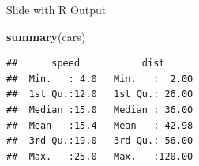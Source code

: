 \documentclass[
  ignorenonframetext,
  aspectratio=169,
  xcolor=dvipsnames]{beamer}
\newenvironment{Shaded}{\begin{snugshade}}{\end{snugshade}}
\newcommand{\FunctionTok}[1]{\textcolor[rgb]{0.13,0.29,0.53}{\textbf{#1}}}
\newcommand{\NormalTok}[1]{#1}
\let\oldShaded\Shaded
\let\endoldShaded\endShaded
\renewenvironment{Shaded}{\footnotesize\oldShaded}{\endoldShaded}
\begin{document}
\begin{frame}[fragile]{Slide with R Output}
\protect{}\label{slide-with-r-output}
\begin{Shaded}
\begin{Highlighting}[]
\FunctionTok{summary}\NormalTok{(cars)}
\end{Highlighting}
\end{Shaded}

\begin{verbatim}
##      speed           dist       
##  Min.   : 4.0   Min.   :  2.00  
##  1st Qu.:12.0   1st Qu.: 26.00  
##  Median :15.0   Median : 36.00  
##  Mean   :15.4   Mean   : 42.98  
##  3rd Qu.:19.0   3rd Qu.: 56.00  
##  Max.   :25.0   Max.   :120.00
\end{verbatim}
\end{frame}
\end{document}
